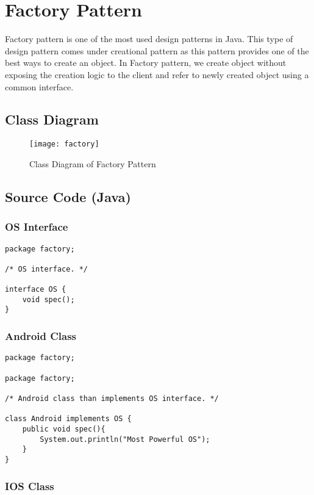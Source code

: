 \newpage
\section{Factory Pattern}
Factory pattern is one of the most used design patterns in Java. This type of design pattern comes under creational pattern as this pattern provides one of the best ways to create an object.
In Factory pattern, we create object without exposing the creation logic to the client and refer to newly created object using a common interface.

\subsection{Class Diagram}

\begin{figure}[h]
\centering
\texttt{[image: factory]}
\caption{Class Diagram of Factory Pattern}
\end{figure}

\newpage
\subsection{Source Code (Java)}

\subsubsection{OS Interface}

\begin{verbatim}
package factory;

/* OS interface. */

interface OS {
    void spec();
}
\end{verbatim}

\subsubsection{Android Class}

\begin{verbatim}
package factory;

package factory;

/* Android class than implements OS interface. */

class Android implements OS {
    public void spec(){
        System.out.println("Most Powerful OS");
    }
}
\end{verbatim}

\subsubsection{IOS Class}

